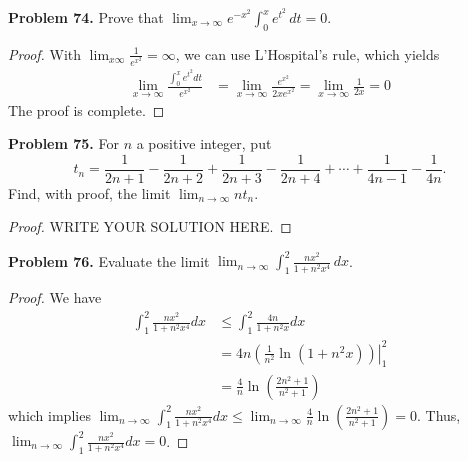 \documentclass[12pt,leqno]{amsart}
\begin{document}
\medskip

\noindent
{\bf Problem 74.}
Prove that $\displaystyle\lim_{x\to\infty}e^{-x^2}\int_0^x e^{t^2}\, dt = 0$.
\begin{proof}
With $\lim_{x\infty}\frac{1}{e^{x^2}} = \infty$, we can use L'Hospital's rule, which yields
\begin{align*}
    \lim_{x\to\infty}\frac{\int_0^x e^{t^2} dt}{e^{x^2}} & = \lim_{x\to\infty}\frac{e^{x^2}}{2x e^{x^2}} = \lim_{x\to\infty}\frac{1}{2x} = 0
\end{align*}
The proof is complete.
\end{proof}

\medskip

\noindent
{\bf Problem 75.}
For $n$ a positive integer, put
$$
t_n=\frac{1}{2n+1}-\frac{1}{2n+2}+\frac{1}{2n+3}-\frac{1}{2n+4}+\cdots+\frac{1}{4n-1}-\frac{1}{4n}.
$$
Find, with proof, the limit $\lim_{n\to\infty} nt_n$.
\begin{proof}
WRITE YOUR SOLUTION HERE.
\end{proof}

\medskip

\noindent
{\bf Problem 76.}
Evaluate the limit $\displaystyle\lim_{n\to\infty}\int_1^2\frac{nx^2}{1+n^2x^4}\, dx$.
\begin{proof}
We have 
\begin{align*}
    \int_1^2\frac{nx^2}{1+n^2x^4} dx & \leq \int_1^2\frac{4n}{1+n^2x} dx \\
    & = 4n \left. \left(\frac{1}{n^2}\ln(1+n^2x) \right) \right|_1^2 \\
    & = \frac{4}{n} \ln \left(\frac{2n^2 + 1}{n^2 + 1}\right)
\end{align*}
which implies $\lim_{n\to\infty}\int_1^2\frac{nx^2}{1+n^2x^4} dx \leq \lim_{n\to\infty}\frac{4}{n} \ln \left(\frac{2n^2 + 1}{n^2 + 1}\right) = 0$. Thus,  $\lim_{n\to\infty} \int_1^2\frac{nx^2}{1+n^2x^4} dx = 0$.
\end{proof}

\medskip
\end{document}
